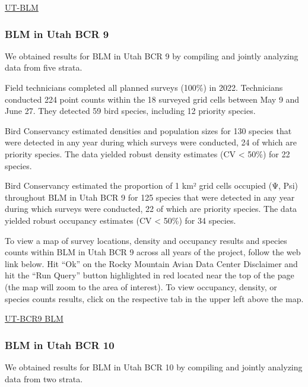 \documentclass[
  letterpaper,
  DIV=11,
  numbers=noendperiod,
  oneside]{scrreprt}
\begin{document}
\href{http://www.rmbo.org/new_site/adc/QueryWindow.aspx\#N4IgzgrgDgpgTmALnAhoiBbEAuABCAVQBUBaAIQBkBZEAXyA}{UT-BLM}

\hypertarget{blm-in-utah-bcr-9}{%
\subsubsection{BLM in Utah BCR 9}\label{blm-in-utah-bcr-9}}

We obtained results for BLM in Utah BCR 9 by compiling and jointly
analyzing data from five strata.

Field technicians completed all planned surveys (100\%) in 2022.
Technicians conducted 224 point counts within the 18 surveyed grid cells
between May 9 and June 27. They detected 59 bird species, including 12
priority species.

Bird Conservancy estimated densities and population sizes for 130
species that were detected in any year during which surveys were
conducted, 24 of which are priority species. The data yielded robust
density estimates (CV \textless{} 50\%) for 22 species.

Bird Conservancy estimated the proportion of 1 km² grid cells occupied
(Ψ, Psi) throughout BLM in Utah BCR 9 for 125 species that were detected
in any year during which surveys were conducted, 22 of which are
priority species. The data yielded robust occupancy estimates (CV
\textless{} 50\%) for 34 species.

To view a map of survey locations, density and occupancy results and
species counts within BLM in Utah BCR 9 across all years of the project,
follow the web link below. Hit ``Ok'' on the Rocky Mountain Avian Data
Center Disclaimer and hit the ``Run Query'' button highlighted in red
located near the top of the page (the map will zoom to the area of
interest). To view occupancy, density, or species counts results, click
on the respective tab in the upper left above the map.

\href{http://www.rmbo.org/new_site/adc/QueryWindow.aspx\#N4IgzgrgDgpgTmALnAhoiBbEAuABCAVQBUBaAIQGEAlATlzIBkBZEAXyA===}{UT-BCR9
BLM}

\hypertarget{blm-in-utah-bcr-10}{%
\subsubsection{BLM in Utah BCR 10}\label{blm-in-utah-bcr-10}}

We obtained results for BLM in Utah BCR 10 by compiling and jointly
analyzing data from two strata.
\end{document}
